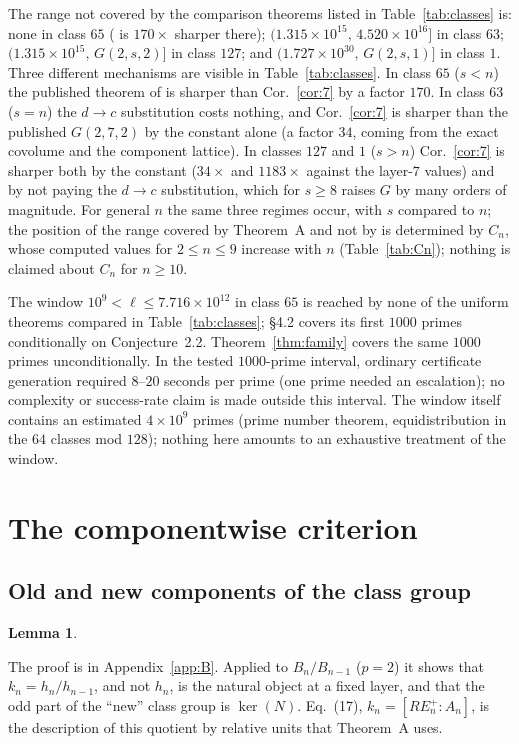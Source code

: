 \documentclass[11pt]{amsart}
\newtheorem{lemma}[theorem]{Lemma}
\theoremstyle{remark}\newtheorem{remark}[theorem]{Remark}
\theoremstyle{definition}\newtheorem{definition}[theorem]{Definition}
\theoremstyle{definition}\newtheorem{algorithm}[theorem]{Algorithm}
\newcommand{\RE}{RE^{+}_n}\newcommand{\ord}{\operatorname{ord}}\newcommand{\hgt}{\operatorname{ht}}
\providecommand{\proofsdir}{../../proofs} %
\begin{document}
The range not covered by the comparison theorems listed in Table~\ref{tab:classes} is: none in class $65$ (\cite{MO16} is $170\times$ sharper there); $(1.315\times10^{15},\,4.520\times10^{16}]$ in class $63$; $(1.315\times10^{15},\,G(2,s,2)]$ in class $127$; and $(1.727\times10^{30},\,G(2,s,1)]$ in class $1$. Three different mechanisms are visible in Table~\ref{tab:classes}. In class $65$ ($s<n$) the published theorem of \cite{MO16} is sharper than Cor.~\ref{cor:7} by a factor $170$. In class $63$ ($s=n$) the $d\to c$ substitution costs nothing, and Cor.~\ref{cor:7} is sharper than the published $G(2,7,2)$ by the constant alone (a factor $34$, coming from the exact covolume and the component lattice). In classes $127$ and $1$ ($s>n$) Cor.~\ref{cor:7} is sharper both by the constant ($34\times$ and $1183\times$ against the layer-$7$ values) and by not paying the $d\to c$ substitution, which for $s\ge8$ raises $G$ by many orders of magnitude. For general $n$ the same three regimes occur, with $s$ compared to $n$; the position of the range covered by Theorem~A and not by \cite{MO16} is determined by $C_n$, whose computed values for $2\le n\le9$ increase with $n$ (Table~\ref{tab:Cn}); nothing is claimed about $C_n$ for $n\ge10$.

The window $10^9<\ell\le7.716\times10^{12}$ in class $65$ is reached by none of the uniform theorems compared in Table~\ref{tab:classes}; \cite{KY} \S4.2 covers its first $1000$ primes conditionally on Conjecture~2.2. Theorem~\ref{thm:family} covers the same $1000$ primes unconditionally. In the tested $1000$-prime interval, ordinary certificate generation required $8$--$20$ seconds per prime (one prime needed an escalation); no complexity or success-rate claim is made outside this interval. The window itself contains an estimated $4\times10^9$ primes (prime number theorem, equidistribution in the $64$ classes mod $128$); nothing here amounts to an exhaustive treatment of the window.

\section{The componentwise criterion}\label{sec:crit}
\subsection{Old and new components of the class group}\label{sec:oldnew}%
\begin{lemma}\label{lem:oldnew}

\end{lemma}
The proof is in Appendix~\ref{app:B}. Applied to $B_n/B_{n-1}$ ($p=2$) it shows that $k_n=h_n/h_{n-1}$, and not $h_n$, is the natural object at a fixed layer, and that the odd part of the ``new'' class group is $\ker(N)$. \cite{KY} Eq.~(17), $k_n=[\RE:A_n]$, is the description of this quotient by relative units that Theorem~A uses.
\end{document}
